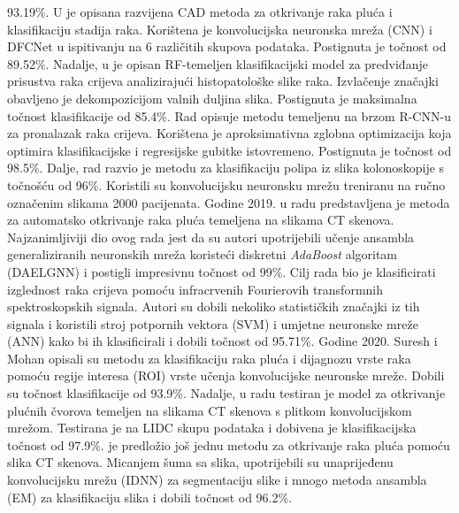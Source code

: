 \documentclass[conference, utf8]{IEEEtran}
\begin{document}
93.19\%. U \cite{masood2018computer} je opisana razvijena CAD metoda za otkrivanje raka pluća i klasifikaciju stadija raka. Korištena je konvolucijska neuronska mreža (CNN) i DFCNet u ispitivanju na 6 različitih skupova podataka. Postignuta je točnost od 89.52\%. Nadalje, u \cite{babu2018colon} je opisan RF-temeljen klasifikacijski model za predviđanje prisustva raka crijeva analizirajući histopatološke slike raka. Izvlačenje značajki obavljeno je dekompozicijom valnih duljina slika. Postignuta je maksimalna točnost klasifikacije od 85.4\%. Rad \cite{mo2018efficient} opisuje metodu temeljenu na brzom R-CNN-u za pronalazak raka crijeva. Korištena je aproksimativna zglobna optimizacija koja optimira klasifikacijske i regresijske gubitke istovremeno. Postignuta je točnost od 98.5\%. Dalje, rad \cite{urban2018deep} razvio je metodu za klasifikaciju polipa iz slika kolonoskopije s točnošću od 96\%. Koristili su konvolucijsku neuronsku mrežu treniranu na ručno označenim slikama 2000 pacijenata. Godine 2019. u radu \cite{shakeel2020automatic} predstavljena je metoda za automatsko otkrivanje raka pluća temeljena na slikama CT skenova. Najzanimljiviji dio ovog rada jest da su autori upotrijebili učenje ansambla generaliziranih neuronskih mreža koristeći diskretni \textit{AdaBoost} algoritam (DAELGNN) i postigli impresivnu točnost od 99\%. Cilj rada \cite{toraman2019classification} bio je klasificirati izglednost raka crijeva pomoću infracrvenih Fourierovih transformnih spektroskopskih signala. Autori su dobili nekoliko statističkih značajki iz tih signala i koristili stroj potpornih vektora (SVM) i umjetne neuronske mreže (ANN) kako bi ih klasificirali i dobili točnost od 95.71\%. Godine 2020. Suresh i Mohan \cite{suresh2020roi} opisali su metodu za klasifikaciju raka pluća i dijagnozu vrste raka pomoću regije interesa (ROI) vrste učenja konvolucijske neuronske mreže. Dobili su točnost klasifikacije od 93.9\%. Nadalje, u radu \cite{masud2020light} testiran je model za otkrivanje plućnih čvorova temeljen na slikama CT skenova s plitkom konvolucijskom mrežom. Testirana je na LIDC skupu podataka i dobivena je klasifikacijska točnost od 97.9\%. \cite{shakeel2022automatic} je predložio još jednu metodu za otkrivanje raka pluća pomoću slika CT skenova. Micanjem šuma sa slika, upotrijebili su unaprijeđenu konvolucijsku mrežu (IDNN) za segmentaciju slike i mnogo metoda ansambla (EM) za klasifikaciju slika i dobili točnost od 96.2\%.
	
\end{document}
